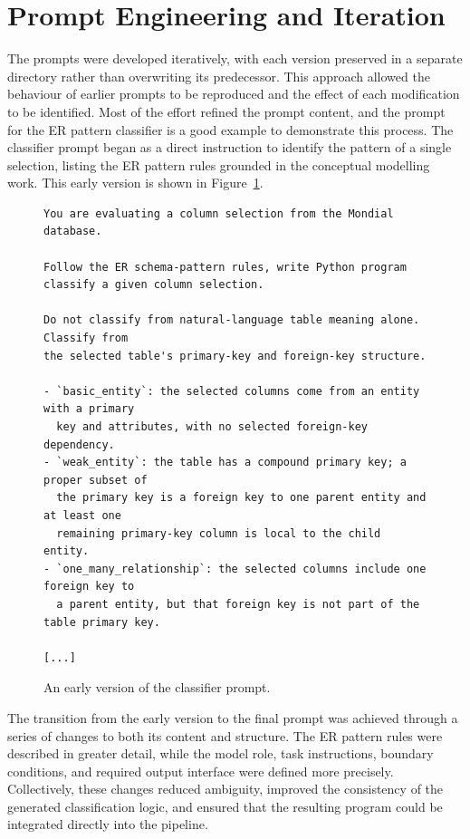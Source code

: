 \section{Prompt Engineering and Iteration}

The prompts were developed iteratively, with each version preserved in a separate directory rather than overwriting its predecessor. This approach allowed the behaviour of earlier prompts to be reproduced and the effect of each modification to be identified. Most of the effort refined the prompt content, and the prompt for the ER pattern classifier is a good example to demonstrate this process. The classifier prompt began as a direct instruction to identify the pattern of a single selection, listing the ER pattern rules grounded in the conceptual modelling work. This early version is shown in Figure~\ref{lst:prompt-early}.

\begin{figure}[htbp]
\begin{lstlisting}[style=prompt]
You are evaluating a column selection from the Mondial database.

Follow the ER schema-pattern rules, write Python program classify a given column selection.

Do not classify from natural-language table meaning alone. Classify from
the selected table's primary-key and foreign-key structure.

- `basic_entity`: the selected columns come from an entity with a primary
  key and attributes, with no selected foreign-key dependency.
- `weak_entity`: the table has a compound primary key; a proper subset of
  the primary key is a foreign key to one parent entity and at least one
  remaining primary-key column is local to the child entity.
- `one_many_relationship`: the selected columns include one foreign key to
  a parent entity, but that foreign key is not part of the table primary key.
  
[...]

\end{lstlisting}
\caption{An early version of the classifier prompt.}
\label{lst:prompt-early}
\end{figure}

The transition from the early version to the final prompt was achieved through a series of changes to both its content and structure. The ER pattern rules were described in greater detail, while the model role, task instructions, boundary conditions, and required output interface were defined more precisely. Collectively, these changes reduced ambiguity, improved the consistency of the generated classification logic, and ensured that the resulting program could be integrated directly into the pipeline.

